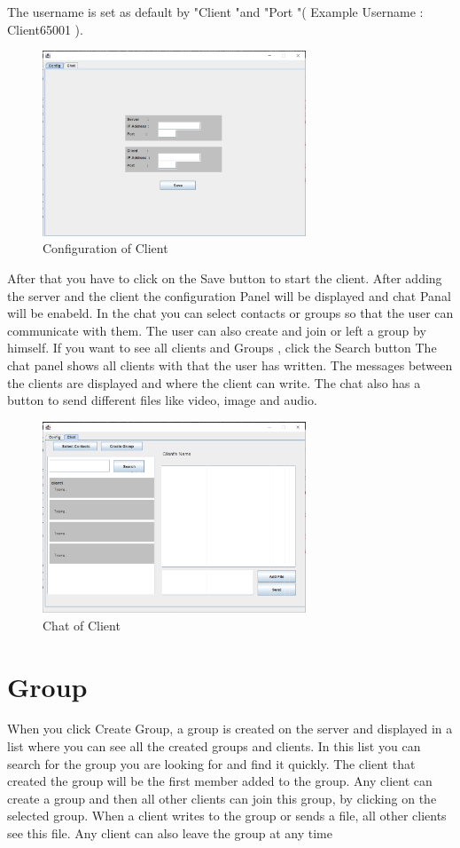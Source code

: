 \noindent
The username is set as default by "Client "and "Port "( Example Username : Client65001 ).
\begin{figure}
    \centering
    \includegraphics[width=0.7\textwidth]{gfx/Client_Config.png}
    \caption{Configuration of Client}
    \label{fig:Client-config}
\end{figure}
\noindent
After that you have to click on the Save button to start the client.
After adding the server and the client the configuration Panel will be displayed and chat Panal
will be enabeld. 
In the chat you can select contacts or groups so that the user can communicate with them.
The user can also create and join or left  a group by himself. 
If you want to see all clients and Groups , click the Search button 
The chat panel shows all clients with that the user has written. 
The messages between the clients are displayed and where the client can write. 
The chat also has a button to send different files like video, image and audio.
\begin{figure}
    \centering
    \includegraphics[width=0.7\textwidth]{gfx/Client_Chat.png}
    \caption{Chat of Client}
    \label{fig:Client-Chat}
\end{figure}

\section {Group}
When you click Create Group, a group is created on the server and displayed in a list 
where you can see all the created groups and clients. In this list you can search for the group
 you are looking for and find it quickly.
The client that created the group will be the first member added to the group.
Any client can create a group and then all other clients can join this group,
by clicking on the selected group. 
When a client writes to the group or sends a file, all other clients see this file.
Any client can also leave the group at any time

